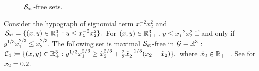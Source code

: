 \begin{figure}[!ht]
 \centering
  \label{fig.ideal.log}
  \hfill
  \label{fig.ideal.power}
\hfill
  \label{fig.exmpl.linear}
  \caption{$\mathcal S_{\mathrm{st}}$-free sets.}
  \label{fig.ideal}
\end{figure}

\begin{example}
Consider the  hypograph of signomial term $x_1^{-2} x_2^{2}$ and
$
	\mathcal S_{\mathrm{st}} = \{(x,y) \in \mathbb R_{+}^3: y \le x_1^{-2} x_2^{2} \}.
$ For $(x,y) \in \mathbb R_{++}^3$, $y \le x_1^{-2} x_2^{2}$ if and only if $ y^{1/3}x_1^{2/3} \le x_2^{2/3}$.  The following set is maximal $\mathcal S_{\mathrm{st}}$-free in $\mathcal G = \mathbb R_+^3$:
$
	\mathcal C_4 \coloneqq \{(x,y) \in \mathbb R_{+}^3:   y^{1/3}x_1^{2/3} \ge  \tilde{x}_2^{2/3} + \frac{2}{3} \tilde{x}_2^{-1/3} (x_2 - \tilde{x}_2)\},
$
where $\tilde{x}_2 \in \mathbb R_{++}$. See  for $\tilde{x}_2 = 0.2$.
\end{example}

